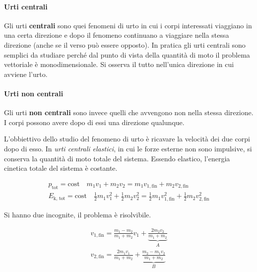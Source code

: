 \paragraph{Urti centrali} Gli urti \textbf{centrali} sono quei fenomeni di urto in cui i corpi interessati viaggiano in una certa direzione e dopo il fenomeno continuano a viaggiare nella stessa direzione (anche se il verso può essere opposto). In pratica gli urti centrali sono semplici da studiare perché dal punto di vista della quantità di moto il problema vettoriale è monodimensionale. Si osserva il tutto nell'unica direzione in cui avviene l'urto.

\paragraph{Urti non centrali} Gli urti \textbf{non centrali} sono invece quelli che avvengono non nella stessa direzione. I corpi possono avere dopo di essi una direzione qualunque.

L'obbiettivo dello studio del fenomeno di urto è ricavare la velocità dei due corpi dopo di esso. In \textit{urti centrali elastici}, in cui le forze esterne non sono impulsive, si conserva la quantità di moto totale del sistema. Essendo elastico, l'energia cinetica totale del sistema è costante.

\begin{gather*}
	p_\text{tot}=\text{cost} \quad m_1 v_1+m_2 v_2=m_1 v_{1,\text{fin}}+m_2 v_{2,\text{fin}} \\
	E_\text{k, tot}=\text{cost} \quad \frac{1}{2}m_1 v_1^2+\frac{1}{2}m_2 v_2^2=\frac{1}{2}m_1 v_{1,\text{fin}}^2+\frac{1}{2}m_2 v_{2,\text{fin}}^2
\end{gather*}

Si hanno due incognite, il problema è risolvibile.

\begin{gather*}
	v_{1,\text{fin}}=\frac{m_1-m_2}{m_1+m_2} v_1+\underbrace{\frac{2m_2 v_2}{m_1+m_2}}_A \\
	v_{2,\text{fin}}=\frac{2m_1 v_1}{m_1+m_2}+\underbrace{\frac{m_2-m_1 v_2}{m_1+m_2}}_B
\end{gather*}

